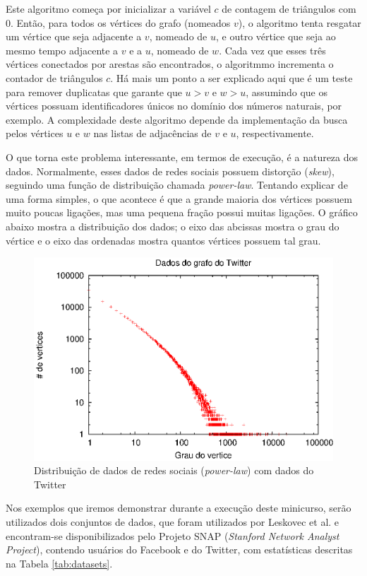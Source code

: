 Este algoritmo começa por inicializar a variável $c$ de contagem de triângulos com $0$. Então, para
todos os vértices do grafo (nomeados $v$), o algoritmo tenta resgatar um vértice que seja adjacente a 
$v$, nomeado de $u$, e outro vértice que seja ao mesmo tempo adjacente a $v$ e a $u$, nomeado de $w$.
Cada vez que esses três vértices conectados por arestas são encontrados, o algoritmmo incrementa o 
contador de triângulos $c$. Há mais um ponto a ser explicado aqui que é um teste para remover duplicatas
que garante que $u>v$ e $w>u$, assumindo que os vértices possuam identificadores únicos no domínio dos
números naturais, por exemplo. A complexidade deste algoritmo depende da implementação da busca pelos 
vértices $u$ e $w$ nas listas de adjacências de $v$ e $u$, respectivamente.

O que torna este problema interessante, em termos de execução, é a natureza dos dados. Normalmente, esses
dados de redes sociais possuem distorção (\emph{skew}), seguindo uma função de distribuição chamada 
\emph{power-law}. Tentando explicar de uma forma simples, o que acontece é que a grande maioria dos 
vértices possuem muito poucas ligações, mas uma pequena fração possui muitas ligações. O gráfico abaixo 
mostra a distribuição dos dados; o eixo das abcissas mostra o grau do vértice e o eixo das ordenadas 
mostra quantos vértices possuem tal grau.

\begin{figure}[h!]
	\centerline{\includegraphics{power_law.eps}}
	\caption{Distribuição de dados de redes sociais (\emph{power-law}) com dados do Twitter}
	\label{fig:powerlaw}
\end{figure}

Nos exemplos que iremos demonstrar durante a execução deste minicurso, serão utilizados dois conjuntos
de dados, que foram utilizados por Leskovec et al. \cite{leskovec2012learning} e encontram-se 
disponibilizados pelo Projeto SNAP (\textit{Stanford Network Analyst Project}), contendo
usuários do Facebook e do Twitter, com estatísticas descritas na Tabela \ref{tab:datasets}.

